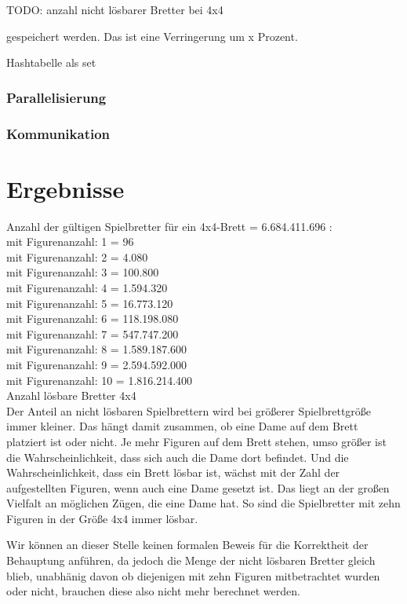 \documentclass[
	12pt,
	a4paper,
	BCOR10mm,
	DIV14,
	listof=totoc,
	bibliography=totoc,
	headsepline
]{scrreprt}
\begin{document}
TODO: anzahl nicht lösbarer Bretter bei 4x4

gespeichert werden. Das ist eine Verringerung um x Prozent.


Hashtabelle als set
\subsection{Parallelisierung}
\subsection{Kommunikation}


\chapter{Ergebnisse}
\label{Ergebnisse}

Anzahl der gültigen Spielbretter für ein 4x4-Brett = 6.684.411.696 :\\
mit Figurenanzahl:  1 =         96 \\
mit Figurenanzahl:  2 =       4.080 \\
mit Figurenanzahl:  3 =     100.800 \\
mit Figurenanzahl:  4 =    1.594.320 \\
mit Figurenanzahl:  5 =   16.773.120 \\
mit Figurenanzahl:  6 =  118.198.080 \\
mit Figurenanzahl:  7 =  547.747.200 \\
mit Figurenanzahl:  8 = 1.589.187.600 \\
mit Figurenanzahl:  9 = 2.594.592.000 \\
mit Figurenanzahl: 10 = 1.816.214.400 \\

Anzahl lösbare Bretter 4x4\\

Der Anteil an nicht lösbaren Spielbrettern wird bei größerer Spielbrettgröße immer kleiner. Das hängt damit zusammen, ob eine Dame auf dem Brett platziert ist oder nicht. Je mehr Figuren auf dem Brett stehen, umso größer ist die Wahrscheinlichkeit, dass sich auch die Dame dort befindet. Und die Wahrscheinlichkeit, dass ein Brett lösbar ist, wächst mit der Zahl der aufgestellten Figuren, wenn auch eine Dame gesetzt ist. 
Das liegt an der großen Vielfalt an möglichen Zügen, die eine Dame hat.
So sind die Spielbretter mit zehn Figuren in der Größe 4x4 immer lösbar.

Wir können an dieser Stelle keinen formalen Beweis für die Korrektheit der Behauptung anführen, da jedoch die Menge der nicht lösbaren Bretter gleich blieb, unabhänig davon ob diejenigen mit zehn Figuren mitbetrachtet wurden oder nicht, brauchen diese also nicht mehr berechnet werden. 
\end{document}
